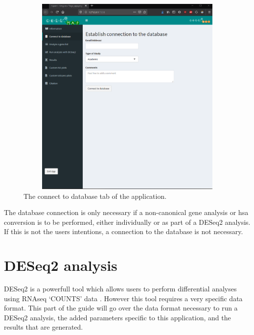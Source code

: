 \documentclass[11pt]{article}
\begin{document}
\begin{figure}[h!]
\centering
\includegraphics[width=15cm,height=10cm,keepaspectratio]{connect_DB.png}
\caption{The connect to database tab of the application.}
\label{fig:connect_DB}
\end{figure}

The database connection is only necessary if a non-canonical gene analysis or \acrshort{hsa} conversion is to be performed, either individually or as part of a \acrshort{DESeq2} analysis. If this is not the users intentions, a connection to the database is not necessary.

\section{DESeq2 analysis}
\acrshort{DESeq2} is a powerfull tool which allows users to perform differential analyses using RNAseq `COUNTS' data \cite{love2014moderated}. However this tool requires a very specific data format. This part of the guide will go over the data format necessary to run a \acrshort{DESeq2} analysis, the added parameters specific to this application, and the results that are generated.
\end{document}
